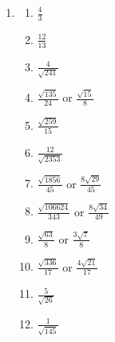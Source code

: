 \documentclass[a4paper,12pt]{article}
\begin{document}
\begin{enumerate}
\item 
    \begin{multicols}{2}
    \begin{enumerate}
    \item $\frac{4}{3}$
    \item $\frac{12}{13}$
    \item $\frac{4}{\sqrt{241}}$
    \item $\frac{\sqrt{135}}{24}$ or $\frac{\sqrt{15}}{8}$
    \item $\frac{\sqrt{259}}{15}$
    \item $\frac{12}{\sqrt{2353}}$
    \item $\frac{\sqrt{1856}}{45}$ or $\frac{8\sqrt{29}}{45}$
    \item $\frac{\sqrt{106624}}{343}$ or $\frac{8\sqrt{34}}{49}$
    \item $\frac{\sqrt{63}}{8}$ or $\frac{3\sqrt{7}}{8}$
    \item $\frac{\sqrt{336}}{17}$ or $\frac{4\sqrt{21}}{17}$
    \item $\frac{5}{\sqrt{26}}$
    \item $\frac{1}{\sqrt{145}}$
    \end{enumerate}
    \end{multicols}
\end{enumerate}
\end{document}
